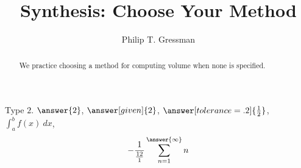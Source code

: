 \documentclass{ximera}
\title{Synthesis: Choose Your Method}
\author{Philip T. Gressman}
\begin{document}
\begin{abstract}
We practice choosing a method for computing volume when none is specified.
\end{abstract}
\maketitle

\begin{problem}
  Type $2$. $\answer{2}$, $\answer[given]{2}$, $\answer[tolerance=.2]{\frac{1}{2}}$,  $\int_a^b f(x) \ dx$,
  \[
  -\frac{1}{\frac{12}{1}}\sum_{n=1}^{\answer{\infty}} n
  \]
\end{problem}
\end{document}
